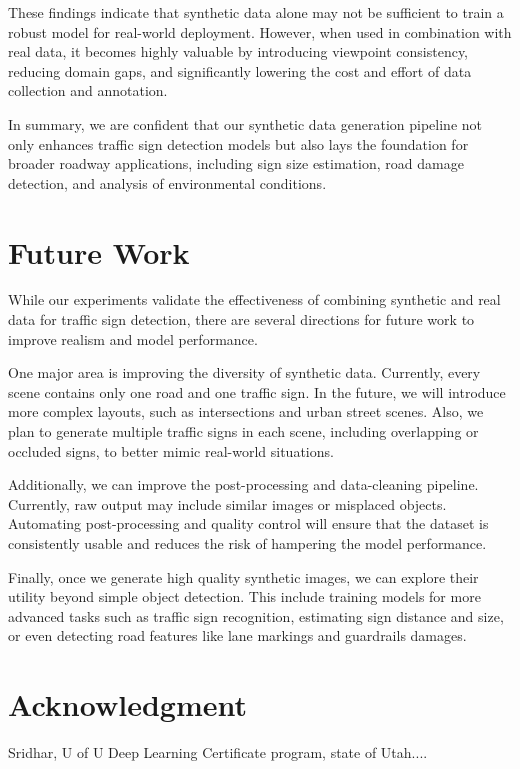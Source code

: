 \documentclass[journal]{IEEEtran}
\begin{document}
These findings indicate that synthetic data alone may not be sufficient to train a robust model for real-world deployment. However, when used in combination with real data, it becomes highly valuable by introducing viewpoint consistency, reducing domain gaps, and significantly lowering the cost and effort of data collection and annotation.

In summary, we are confident that our synthetic data generation pipeline not only enhances traffic sign detection models but also lays the foundation for broader roadway applications, including sign size estimation, road damage detection, and analysis of environmental conditions.

\section{Future Work}
While our experiments validate the effectiveness of combining synthetic and real data for traffic sign detection, there are several directions for future work to improve realism and model performance.

One major area is improving the diversity of synthetic data. Currently, every scene contains only one road and one traffic sign. In the future, we will introduce more complex layouts, such as intersections and urban street scenes. Also, we plan to generate multiple traffic signs in each scene, including overlapping or occluded signs, to better mimic real-world situations.

Additionally, we can improve the post-processing and data-cleaning pipeline. Currently, raw output may include similar images or misplaced objects. Automating post-processing and quality control will ensure that the dataset is consistently usable and reduces the risk of hampering the model performance.

Finally, once we generate high quality synthetic images, we can explore their utility beyond simple object detection. This include training models for more advanced tasks such as traffic sign recognition, estimating sign distance and size, or even detecting road features like lane markings and guardrails damages. 

\section*{Acknowledgment}


Sridhar, U of U Deep Learning Certificate program, state of Utah.... 
\end{document}

